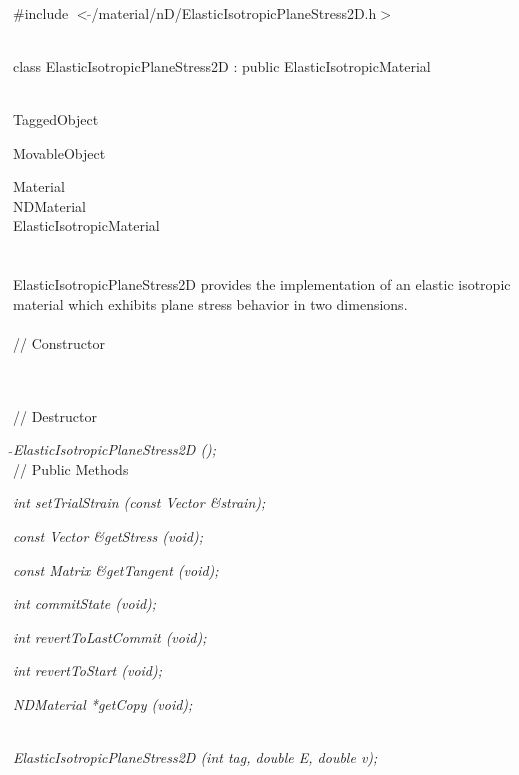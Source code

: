 
   \\
\#include $<\tilde{ }$/material/nD/ElasticIsotropicPlaneStress2D.h$>$  


  \\
class ElasticIsotropicPlaneStress2D : public ElasticIsotropicMaterial 


 \\
TaggedObject 

MovableObject 

\indent\indent Material \\
\indent\indent\indent NDMaterial \\
\indent\indent\indent\indent ElasticIsotropicMaterial \\
\indent\indent\indent\indent{} \\

  \\
ElasticIsotropicPlaneStress2D provides the implementation of an
elastic isotropic material which exhibits plane stress behavior in two
dimensions. \\

 \\
// Constructor 

  \\ \\
// Destructor 

{\em $\tilde{ }$ElasticIsotropicPlaneStress2D ();}\\ 

// Public Methods 

{\em int setTrialStrain (const Vector \&strain); } 

{\em const Vector \&getStress (void); } 

{\em const Matrix \&getTangent (void); } 

{\em int commitState (void); } 

{\em int revertToLastCommit (void); } 

{\em int revertToStart (void); } 

{\em NDMaterial *getCopy (void); } 


  \\
{\em ElasticIsotropicPlaneStress2D (int tag, double E, double v);}  

